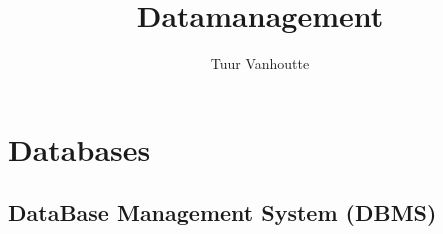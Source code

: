 \documentclass{article}
\begin{document}
\begin{titlepage}
    \author{Tuur Vanhoutte}
    \title{Datamanagement}
\end{titlepage}


\maketitle
\newpage
\tableofcontents
\newpage


\section{Databases}

\subsection{DataBase Management System (DBMS)}
\end{document}
